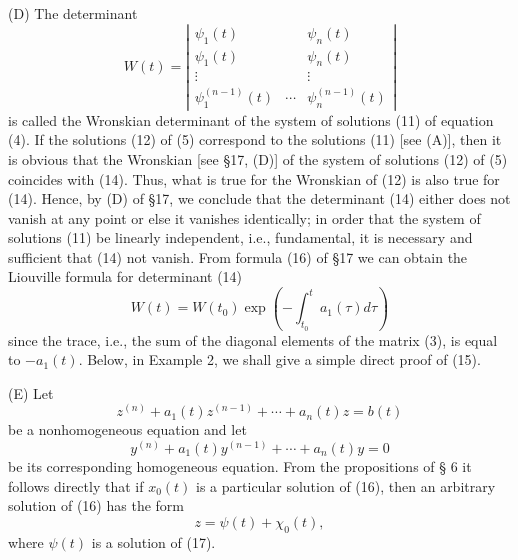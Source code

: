 \documentclass[10pt,a5paper]{book}
\theoremstyle{plain}
\theoremstyle{definition}
\theoremstyle{remark}
\begin{document}
(D) The determinant
\[
W(t)=\left|\begin{array}{ccc}
\psi_{1}(t) & & \psi_{n}(t)  \tag{14}\\
\psi_{1}(t) & & \psi_{n}(t) \\
\vdots & & \vdots \\
\psi_{1}^{(n-1)}(t) & \cdots & \psi_{n}^{(n-1)}(t)
\end{array}\right|
\]
is called the Wronskian determinant of the system of solutions (11) of equation (4). If the solutions (12) of (5) correspond to the solutions (11) [see (A)], then it is obvious that the Wronskian [see §17, (D)] of the system of solutions (12) of (5) coincides with (14). Thus, what is true for the Wronskian of (12) is also true for (14). Hence, by (D) of §17, we conclude that the determinant (14) either does not vanish at any point or else it vanishes identically; in order that the system of solutions (11) be linearly independent, i.e., fundamental, it is necessary and sufficient that (14) not
vanish. From formula (16) of §17 we can obtain the Liouville formula for determinant (14)
\begin{equation*}
W(t)=W\left(t_{0}\right) \exp \left(-\int_{t_{0}}^{t} a_{1}(\tau) d \tau\right) \tag{15}
\end{equation*}
since the trace, i.e., the sum of the diagonal elements of the matrix (3), is equal to $-a_{1}(t)$. Below, in Example 2, we shall give a simple direct proof of (15).

(E) Let
\begin{equation*}
z^{(n)}+a_{1}(t) z^{(n-1)}+\cdots+a_{n}(t) z=b(t) \tag{16}
\end{equation*}
be a nonhomogeneous equation and let
\begin{equation*}
y^{(n)}+a_{1}(t) y^{(n-1)}+\cdots+a_{n}(t) y=0 \tag{17}
\end{equation*}
be its corresponding homogeneous equation. From the propositions of § 6 it follows directly that if $x_{0}(t)$ is a particular solution of (16), then an arbitrary solution of (16) has the form
\[
z=\psi(t)+\chi_{0}(t),
\]
where $\psi(t)$ is a solution of (17).
\end{document}
